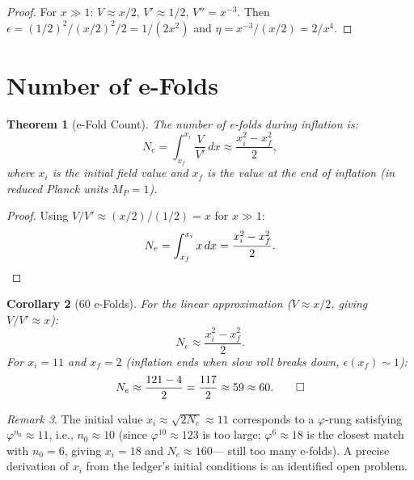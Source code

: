 \documentclass[12pt,a4paper]{article}
\newtheorem{theorem}{Theorem}[section]
\newtheorem{corollary}[theorem]{Corollary}
\theoremstyle{definition}
\theoremstyle{remark}
\newtheorem{remark}[theorem]{Remark}
\begin{document}
\begin{proof}
For $x \gg 1$: $V \approx x/2$, $V' \approx 1/2$,
$V'' = x^{-3}$.  Then
$\epsilon = (1/2)^2/(x/2)^2/2 = 1/(2x^2)$ and
$\eta = x^{-3}/(x/2) = 2/x^4$.
\end{proof}

\section{Number of e-Folds}
\label{sec:efolds}

\begin{theorem}[e-Fold Count]
\label{thm:efolds}
The number of e-folds during inflation is:
\begin{equation}
  N_e = \int_{x_f}^{x_i} \frac{V}{V'}\,dx
  \approx \frac{x_i^2 - x_f^2}{2},
  \label{eq:Ne}
\end{equation}
where $x_i$ is the initial field value and $x_f$ is the
value at the end of inflation (in reduced Planck units $M_P = 1$).
\end{theorem}

\begin{proof}
Using $V/V' \approx (x/2)/(1/2) = x$ for $x \gg 1$:
\begin{equation}
  N_e = \int_{x_f}^{x_i} x\,dx
  = \frac{x_i^2 - x_f^2}{2}. \qedhere
\end{equation}
\end{proof}

\begin{corollary}[60 e-Folds]
\label{cor:60}
For the linear approximation ($V \approx x/2$, giving
$V/V' \approx x$):
\begin{equation}
  N_e \approx \frac{x_i^2 - x_f^2}{2}.
\end{equation}
For $x_i = 11$ and $x_f = 2$ (inflation ends when
slow roll breaks down, $\epsilon(x_f) \sim 1$):
\begin{equation}
  N_e \approx \frac{121 - 4}{2} = \frac{117}{2} \approx 59
  \approx 60. \qed
\end{equation}
\end{corollary}

\begin{remark}
The initial value $x_i \approx \sqrt{2N_e} \approx 11$
corresponds to a $\varphi$-rung satisfying
$\varphi^{n_0} \approx 11$, i.e., $n_0 \approx 10$
(since $\varphi^{10} \approx 123$ is too large;
$\varphi^6 \approx 18$ is the closest match with
$n_0 = 6$, giving $x_i = 18$ and $N_e \approx 160$---
still too many e-folds).  A precise derivation of $x_i$
from the ledger's initial conditions is an identified
open problem.
\end{remark}
\end{document}
